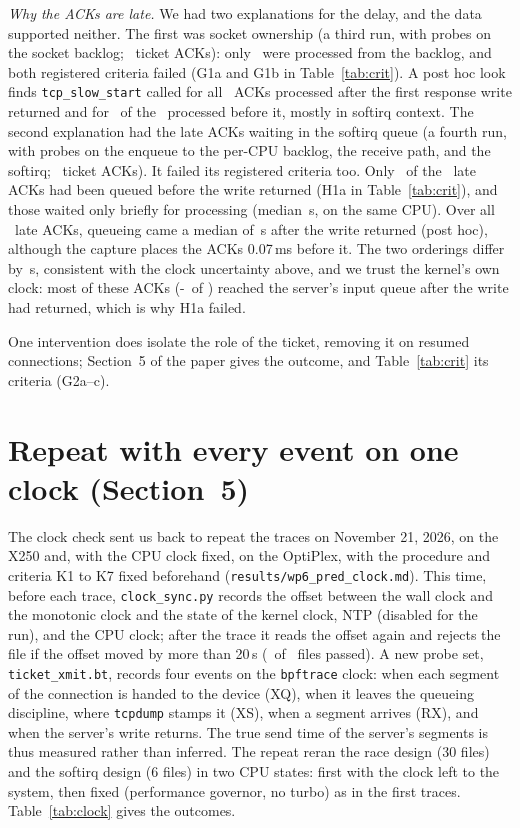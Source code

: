 \documentclass[9pt]{article}
\newcommand{\ms}{\,ms\xspace}
\begin{document}
\emph{Why the ACKs are late.} We had two explanations for the delay, and the data supported neither. The first was socket ownership (a third run, with probes on the socket backlog; \BkN\ ticket ACKs): only \BkDef\ were processed from the backlog, and both registered criteria failed (G1a and G1b in Table~\ref{tab:crit}). A post hoc look finds \texttt{tcp\_slow\_start} called for all \PhAfterSS\ ACKs processed after the first response write returned and for \PhBeforeSS\ of the \PhBefore\ processed before it, mostly in softirq context. The second explanation had the late ACKs waiting in the softirq queue (a fourth run, with probes on the enqueue to the per-CPU backlog, the receive path, and the softirq; \HN\ ticket ACKs). It failed its registered criteria too. Only \HAOne\ of the \HALate\ late ACKs had been queued before the write returned (H1a in Table~\ref{tab:crit}), and those waited only briefly for processing (median \HWaitMed\,\textmu s, on the same CPU). Over all \HALate\ late ACKs, queueing came a median of \HEnqMed\,\textmu s after the write returned (post hoc), although the capture places the ACKs 0.07\ms before it. The two orderings differ by \ClkDiff\,\textmu s, consistent with the clock uncertainty above, and we trust the kernel's own clock: most of these ACKs (\the\numexpr\HALate-\HAOne\relax\ of \HALate) reached the server's input queue after the write had returned, which is why H1a failed.

One intervention does isolate the role of the ticket, removing it on resumed connections; Section~5 of the paper gives the outcome, and Table~\ref{tab:crit} its criteria (G2a--c).

\section*{Repeat with every event on one clock (Section~5)}
The clock check sent us back to repeat the traces on November 21, 2026, on the X250 and, with the CPU clock fixed, on the OptiPlex, with the procedure and criteria K1 to K7 fixed beforehand (\texttt{results/wp6\_pred\_clock.md}). This time, before each trace, \texttt{clock\_sync.py} records the offset between the wall clock and the monotonic clock and the state of the kernel clock, NTP (disabled for the run), and the CPU clock; after the trace it reads the offset again and rejects the file if the offset moved by more than 20\,\textmu s (\RpFiles\ of \RpFiles\ files passed). A new probe set, \texttt{ticket\_xmit.bt}, records four events on the \texttt{bpftrace} clock: when each segment of the connection is handed to the device (XQ), when it leaves the queueing discipline, where \texttt{tcpdump} stamps it (XS), when a segment arrives (RX), and when the server's write returns. The true send time of the server's segments is thus measured rather than inferred. The repeat reran the race design (30 files) and the softirq design (6 files) in two CPU states: first with the clock left to the system, then fixed (performance governor, no turbo) as in the first traces. Table~\ref{tab:clock} gives the outcomes.
\end{document}
